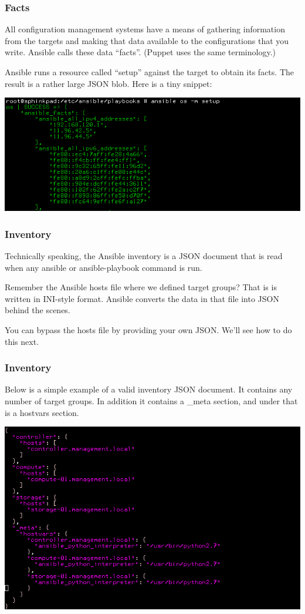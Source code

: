 \documentclass[helvetica,english,utf8,notitle,nologo]{beamer}
\begin{document}
\begin{frame}
  \frametitle{Facts}

  All configuration management systems have a means of gathering
  information from the targets and making that data available to the
  configurations that you write. Ansible calls these data
  ``facts''. (Puppet uses the same terminology.)

  Ansible runs a resource called ``setup'' against the target to
  obtain its facts. The result is a rather large JSON blob. Here is a
  tiny snippet:

  \includegraphics[scale=0.44]{img_8}
\end{frame}

\begin{frame}
  \frametitle{Inventory}

  Technically speaking, the Ansible inventory is a JSON document that
  is read when any ansible or ansible-playbook command is run.

  Remember the Ansible hosts file where we defined target groups? That
  is is written in INI-style format. Ansible converts the data in that
  file into JSON behind the scenes.

  You can bypass the hosts file by providing your own JSON. We'll see
  how to do this next.
\end{frame}

\begin{frame}
  \frametitle{Inventory}

  Below is a simple example of a valid inventory JSON document. It
  contains any number of target groups. In addition it contains a
  \_meta section, and under that is a hostvars section.

  \includegraphics[scale=0.44]{img_9}
\end{frame}
\end{document}
